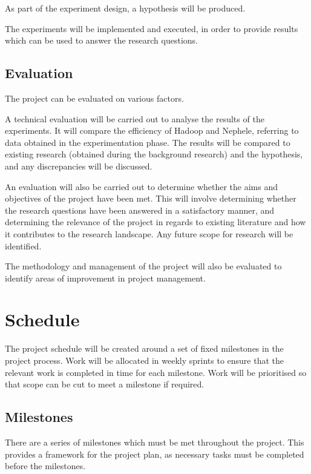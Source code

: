 As part of the experiment design, a hypothesis will be produced.

The experiments will be implemented and executed, in order to provide results which can be used to answer the research questions.

\subsection{Evaluation}
The project can be evaluated on various factors.

A technical evaluation will be carried out to analyse the results of the experiments. It will compare the efficiency of Hadoop and Nephele, referring to data obtained in the experimentation phase. The results will be compared to existing research (obtained during the background research) and the hypothesis, and any discrepancies will be discussed. 

An evaluation will also be carried out to determine whether the aims and objectives of the project have been met. This will involve determining whether the research questions have been answered in a satisfactory manner, and determining the relevance of the project in regards to existing literature and how it contributes to the research landscape. Any future scope for research will be identified. 

The methodology and management of the project will also be evaluated to identify areas of improvement in project management.

\section{Schedule}
The project schedule will be created around a set of fixed milestones in the project process. Work will be allocated in weekly sprints to ensure that the relevant work is completed in time for each milestone. Work will be prioritised so that scope can be cut to meet a milestone if required.

\subsection{Milestones}
There are a series of milestones which must be met throughout the project. This provides a framework for the project plan, as necessary tasks must be completed before the milestones.

